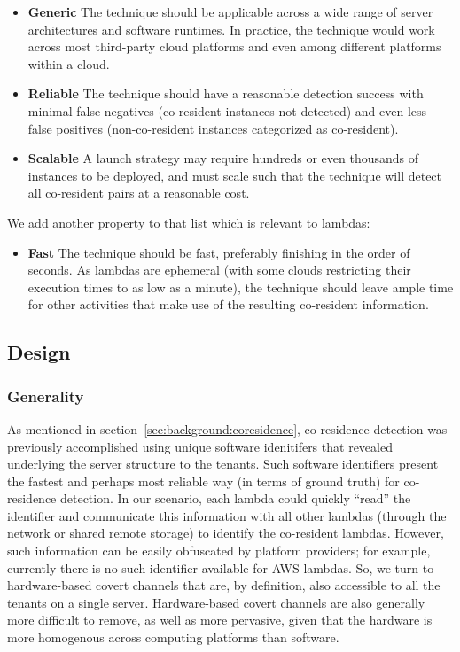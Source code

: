 \begin{itemize}
    \item \textbf{Generic} The technique should be applicable across a wide
    range of server architectures and software runtimes. In practice, the
    technique would work across most third-party cloud platforms and even 
    among different platforms within a cloud.
    \item \textbf{Reliable} The technique should have a reasonable detection success
    with minimal false negatives (co-resident instances not detected) and even 
    less false positives (non-co-resident instances categorized as co-resident).
    \item \textbf{Scalable} A launch strategy may require hundreds or even
    thousands of instances to be deployed, and must scale such that the
    technique will detect all co-resident pairs at a reasonable cost.
\end{itemize}

\noindent We add another property to that list which is relevant to lambdas:
\begin{itemize}
    \item \textbf{Fast} The technique should be fast, preferably finishing in 
    the order of seconds. As lambdas are ephemeral (with some clouds restricting their 
    execution times to as low as a minute), the technique should leave ample time 
    for other activities that make use of the resulting co-resident information.
\end{itemize}


\subsection{Design}

\subsubsection{Generality}
As mentioned in section~\ref{sec:background:coresidence}, co-residence detection
was previously accomplished using unique software idenitifers that revealed
underlying the server structure to the tenants. Such software identifiers
present the fastest and perhaps most reliable way (in terms of ground
truth) for co-residence detection. 
In our scenario, each lambda could quickly ``read'' the identifier
and communicate this information with all other lambdas (through the network or
shared remote storage) to identify the co-resident lambdas. However, such
information can be easily obfuscated by platform providers; for example,
currently there is no such identifier available for AWS lambdas.  So, we turn to
hardware-based covert channels that are, by definition, also accessible to all
the tenants on a single server. Hardware-based covert channels are also
generally more difficult to remove, as well as more pervasive,
given that the hardware is more homogenous across computing platforms
than software. 


